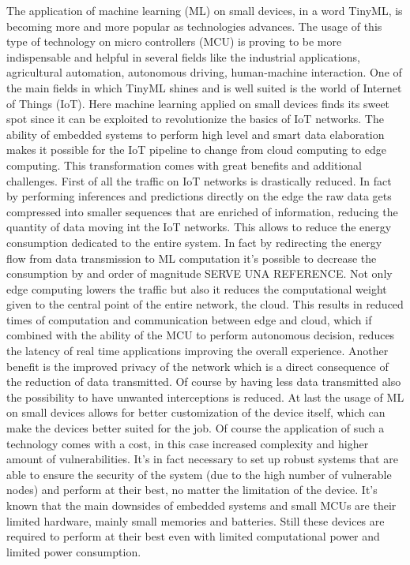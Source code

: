 \documentclass[12pt]{report}
\begin{document}
The application of machine learning (ML) on small devices, in a word TinyML, is becoming more and more popular as technologies advances. The usage of this type of technology on micro controllers (MCU) is proving to be more indispensable and helpful in several fields like the industrial applications, agricultural automation, autonomous driving, human-machine interaction. One of the main fields in which TinyML shines and is well suited is the world of Internet of Things (IoT). Here machine learning applied on small devices finds its sweet spot since it can be exploited to revolutionize the basics of IoT networks. The ability of embedded systems to perform high level and smart data elaboration makes it possible for the IoT pipeline to change from cloud computing to edge computing. This transformation comes with great benefits and additional challenges. 
First of all the traffic on IoT networks is drastically reduced. In fact by performing inferences and predictions directly on the edge the raw data gets compressed into smaller sequences that are enriched of information, reducing the quantity of data moving int the IoT networks. This allows to reduce the energy consumption dedicated to the entire system. In fact by redirecting the energy flow from data transmission to ML computation it's possible to decrease the consumption by and order of magnitude \cite{} SERVE UNA REFERENCE. 
Not only edge computing lowers the traffic but also it reduces the computational weight given to the central point of the entire network, the cloud. This results in reduced times of computation and communication between edge and cloud, which if combined with the ability of the MCU to perform autonomous decision, reduces the latency of real time applications improving the overall experience. 
Another benefit is the improved privacy of the network which is a direct consequence of the reduction of data transmitted. Of course by having less data transmitted also the possibility to have unwanted interceptions is reduced. At last the usage of ML on small devices allows for better customization of the device itself, which can make the devices better suited for the job. 
Of course the application of such a technology comes with a cost, in this case increased complexity and higher amount of vulnerabilities. It's in fact necessary to set up robust systems that are able to ensure the security of the system (due to the high number of vulnerable nodes) and perform at their best, no matter the limitation of the device. It's known that the main downsides of embedded systems and small MCUs are their limited hardware, mainly small memories and batteries. Still these devices are required to perform at their best even with limited computational power and limited power consumption.\\
\end{document}

